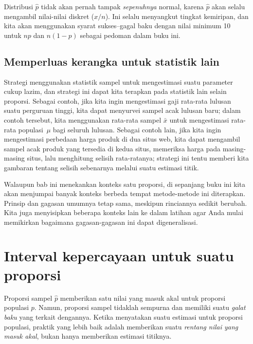 Distribusi $\hat{p}$ tidak akan pernah tampak
\emph{sepenuhnya} normal, karena $\hat{p}$ akan selalu
mengambil nilai-nilai diskret ($x / n$).
Ini selalu menyangkut tingkat kemiripan, dan kita akan menggunakan
syarat sukses--gagal baku dengan nilai minimum
10 untuk $np$ dan $n (1 - p)$ sebagai pedoman
dalam buku ini.


\subsection{Memperluas kerangka untuk statistik lain}

Strategi menggunakan statistik sampel untuk mengestimasi
suatu parameter cukup lazim, dan strategi ini dapat
kita terapkan pada statistik lain selain proporsi.
Sebagai contoh, jika kita ingin mengestimasi gaji rata-rata
lulusan suatu perguruan tinggi, kita dapat
menyurvei sampel acak lulusan baru;
dalam contoh tersebut, kita menggunakan rata-rata sampel $\bar{x}$
untuk mengestimasi rata-rata populasi~$\mu$ bagi seluruh lulusan.
Sebagai contoh lain, jika kita ingin mengestimasi
perbedaan harga produk di dua situs web,
kita dapat mengambil sampel acak produk yang tersedia
di kedua situs, memeriksa harga pada masing-masing situs,
lalu menghitung selisih rata-ratanya;
strategi ini tentu memberi kita gambaran
tentang selisih sebenarnya melalui suatu estimasi titik.

Walaupun bab ini menekankan konteks satu proporsi,
di sepanjang buku ini kita akan menjumpai banyak konteks berbeda
tempat metode-metode ini diterapkan.
Prinsip dan gagasan umumnya tetap sama,
meskipun rinciannya sedikit berubah.
Kita juga menyisipkan beberapa konteks lain ke dalam
latihan agar Anda mulai memikirkan
bagaimana gagasan-gagasan ini dapat digeneralisasi.

{}

\section{Interval kepercayaan untuk suatu proporsi}
\label{confidenceIntervals}


Proporsi sampel $\hat{p}$ memberikan satu nilai yang masuk akal
untuk proporsi populasi $p$. Namun, proporsi sampel
tidaklah sempurna dan memiliki suatu \emph{galat baku}
yang terkait dengannya.
Ketika menyatakan suatu estimasi untuk proporsi populasi,
praktik yang lebih baik adalah memberikan suatu
\emph{rentang nilai yang masuk akal}, bukan hanya memberikan
estimasi titiknya.


